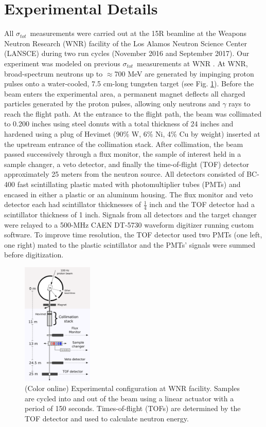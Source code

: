 \documentclass[twocolumn,secnumarabic,amssymb, nobibnotes, aps, prl,
superscriptaddress, nobalancelastpage]{revtex4}
\newcommand{\tot}{\ensuremath{\sigma_{tot}}}
\begin{document}
\section{Experimental Details}
All \tot\ measurements were carried out at the 15R
beamline at the Weapons Neutron Research (WNR) facility of the Los Alamos
Neutron Science Center (LANSCE) during two run cycles (November 2016 and
September 2017). Our experiment was modeled on previous
\tot\ measurements at WNR \cite{Finlay1993,Abfalterer2001,Shane2010}.
At WNR,
broad-spectrum neutrons up
to $\approx$700 MeV are generated by impinging proton pulses onto a water-cooled, 7.5
cm-long tungsten target (see Fig. \ref{ExperimentalApparatus}). Before the beam
enters the experimental area, a
permanent magnet deflects all charged particles generated by the proton pulses, 
allowing only neutrons and $\gamma$ rays to reach the flight path. At the
entrance to the flight path, the beam was collimated to 0.200 inches using steel
donuts with a total thickness of 24 inches and hardened using a plug of Hevimet (90\% W, 6\% 
Ni, 4\% Cu by weight) inserted at the upstream entrance of the
collimation stack. After collimation, the beam passed successively through a flux 
monitor, the sample of interest held in a sample changer, a veto detector, and finally the 
time-of-flight (TOF) detector approximately 25 meters from the neutron source.
All detectors consisted of BC-400 fast scintillating plastic mated with 
photomultiplier tubes (PMTs) and encased in either a plastic or
an aluminum housing. The flux monitor and veto detector each had
scintillator thicknesses of $\frac{1}{4}$ inch and the TOF detector had a
scintillator thickness of 1 inch. Signals from all detectors and
the target changer were relayed to a 500-MHz CAEN DT-5730 waveform digitizer
running custom software. To improve time resolution, the TOF detector used two
PMTs (one left, one right) mated to the plastic scintillator and the PMTs' signals were 
summed before digitization.

\begin{figure}
    \includegraphics[width=0.3\textwidth]{figures/ExperimentalSetup.png}
    \caption{(Color online) Experimental configuration at WNR facility.
        Samples are cycled into and out of the beam
        using a linear actuator with a period of 150 seconds. Times-of-flight (TOFs) are
    determined by the TOF detector and used to calculate neutron energy.}
    \label{ExperimentalApparatus}
\end{figure}
\end{document}
